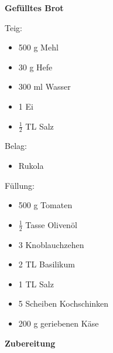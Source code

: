 
\parindent0pt	

\pagestyle{empty}


\textbf{{\LARGE Gefülltes Brot}}%

\hrulefill

\vspace*{\fill}
\begin{multicols}{2}	


Teig:
\begin{itemize}
\item 500 g Mehl
\item 30 g Hefe
\item 300 ml Wasser
\item 1 Ei
\item $\frac{1}{2}$ TL Salz
\end{itemize}

Belag: 
\begin{itemize}
\item Rukola
\end{itemize}

Füllung:
\begin{itemize}
\item 500 g Tomaten
\item $\frac{1}{2}$ Tasse Olivenöl
\item 3 Knoblauchzehen
\item 2 TL Basilikum
\item 1 TL Salz
\item 5 Scheiben Kochschinken
\item 200 g geriebenen Käse
\end{itemize}


\end{multicols}


\vfill
\newpage
\textbf{{\LARGE Zubereitung}}%

\hrulefill

